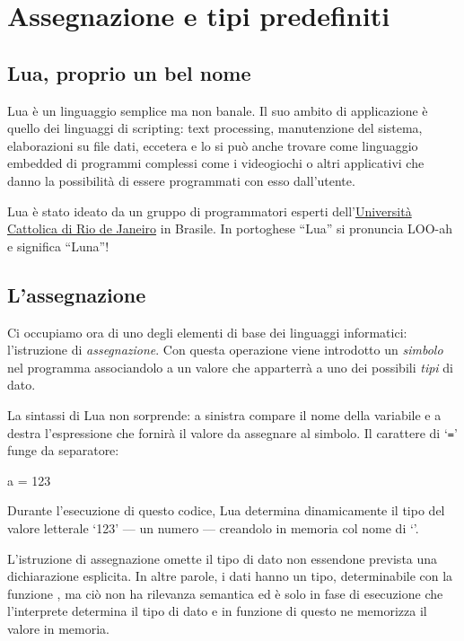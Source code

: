
\chapter{Assegnazione e tipi predefiniti}
\label{chFondAssignment}


\section{Lua, proprio un bel nome}

Lua è un linguaggio semplice ma non banale. Il suo ambito di applicazione è
quello dei linguaggi di scripting: text processing, manutenzione del sistema,
elaborazioni su file dati, eccetera e lo si può anche trovare come linguaggio
embedded di programmi complessi come i videogiochi o altri applicativi
che danno la possibilità di essere programmati con esso dall'utente.

Lua è stato ideato da un gruppo di programmatori esperti
dell'\href{http://www.puc-rio.br/index.html}{Università Cattolica di Rio de
Janeiro} in Brasile. In portoghese ``Lua'' si pronuncia LOO-ah e significa
``Luna''!


\section{L'assegnazione}
\label{secFondAssegnazione}

Ci occupiamo ora di uno degli elementi di base dei linguaggi informatici:
l'istruzione di \emph{assegnazione}. Con questa operazione viene introdotto un
\emph{simbolo} nel programma associandolo a un valore che apparterrà a uno
dei possibili \emph{tipi} di dato.

La sintassi di Lua non sorprende: a sinistra compare il nome della variabile e
a destra l'espressione che fornirà il valore da assegnare al simbolo. Il
carattere di `\texttt{=}' funge da separatore:
\begin{lines}
a = 123
\end{lines}

Durante l'esecuzione di questo codice, Lua determina dinamicamente il tipo del
valore letterale `123' --- un numero --- creandolo in memoria col nome di
`'.

L'istruzione di assegnazione omette il tipo di dato non essendone prevista una
dichiarazione esplicita. In altre parole, i dati hanno un tipo, determinabile
con la funzione , ma ciò non ha rilevanza semantica ed è
solo in fase di esecuzione che l'interprete determina il tipo di dato e in
funzione di questo ne memorizza il valore in memoria.

